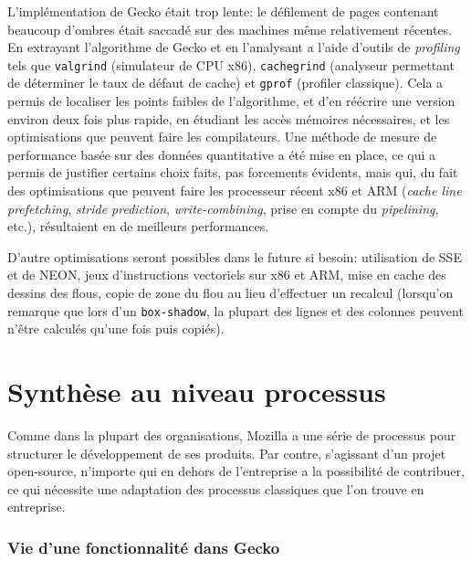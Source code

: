 \documentclass[a4paper,10pt]{article}
\newcommand{\cc}[1]{\texttt{#1}}
\begin{document}
\begin{multicols}{2}
  L'implémentation de Gecko était trop lente: le défilement de pages contenant
  beaucoup d'ombres était saccadé sur des machines même relativement récentes.
  En extrayant l'algorithme de Gecko et en l'analysant a l'aide d'outils de
  \emph{profiling} tels que \cc{valgrind} (simulateur de CPU x86),
  \cc{cachegrind} (analyseur permettant de déterminer le taux de défaut de
  cache) et \cc{gprof} (profiler classique). Cela a permis de localiser les
  points faibles de l'algorithme, et d'en réécrire une version environ deux fois
  plus rapide, en étudiant les accès mémoires nécessaires, et les optimisations
  que peuvent faire les compilateurs. Une méthode de mesure de performance basée
  sur des données quantitative a été mise en place, ce qui a permis de justifier
  certains choix faits, pas forcements évidents, mais qui, du fait des
  optimisations que peuvent faire les processeur récent x86 et ARM (\emph{cache
  line prefetching}, \emph{stride prediction}, \emph{write-combining}, prise en
  compte du \emph{pipelining}, etc.), résultaient en de meilleurs performances.

  D'autre optimisations seront possibles dans le future si besoin: utilisation
  de SSE et de NEON, jeux d'instructions vectoriels sur x86 et ARM, mise en cache
  des dessins des flous, copie de zone du flou au lieu d'effectuer un recalcul
  (lorsqu'on remarque que lors d'un \cc{box-shadow}, la plupart des lignes et
  des colonnes peuvent n'être calculés qu'une fois puis copiés).

  \part{Synthèse au niveau processus}

  Comme dans la plupart des organisations, Mozilla a une série de processus pour
  structurer le développement de ses produits. Par contre, s'agissant d'un
  projet open-source, n'importe qui en dehors de l'entreprise a la possibilité
  de contribuer, ce qui nécessite une adaptation des processus classiques que
  l'on trouve en entreprise.

  \section{Vie d'une fonctionnalité dans Gecko}


\end{multicols}
\end{document}
